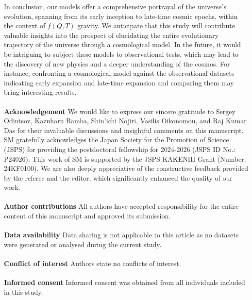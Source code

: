 \documentclass[aps,prd,showpacs,nofootinbib,floats,floatfix,preprintnumbers,groupedaddress,twocolumn]{revtex4-1}
\begin{document}
    In conclusion, our models offer a comprehensive portrayal of the universe's evolution, spanning from its early inception to late-time cosmic epochs, within the context of $f(Q,T)$ gravity. We anticipate that this study will contribute valuable insights into the prospect of elucidating the entire evolutionary trajectory of the universe through a cosmological model. In the future, it would be intriguing to subject these models to observational tests, which may lead to the discovery of new physics and a deeper understanding of the cosmos. For instance, confronting a cosmological model against the observational datasets indicating early expansion and late-time expansion and comparing them may bring interesting results.
\\ \\
\textbf{Acknowledgement}
    We would like to express our sincere gratitude to Sergey Odintsov, Kazuharu Bamba, Shin’ichi Nojiri, Vasilis Oikonomou, and Raj Kumar Das for their invaluable discussions and insightful comments on this manuscript. SM gratefully acknowledges the Japan Society for the Promotion of Science (JSPS) for providing the postdoctoral fellowship for 2024-2026 (JSPS ID No.: P24026). This work of SM is supported by the JSPS KAKENHI Grant (Number: 24KF0100). We are also deeply appreciative of the constructive feedback provided by the referee and the editor, which significantly enhanced the quality of our work.
\\ \\
\textbf{Author contributions}
    All authors have accepted responsibility for the entire content of this manuscript and approved its submission.
\\ \\
\textbf{Data availability} 
    Data sharing is not applicable to this article as no datasets were generated or analysed during the current study.
\\ \\
\textbf{Conflict of interest} 
    Authors state no conflicts of interest.
\\ \\
\textbf{Informed consent} 
    Informed consent was obtained from all individuals included in this study.
\end{document}
